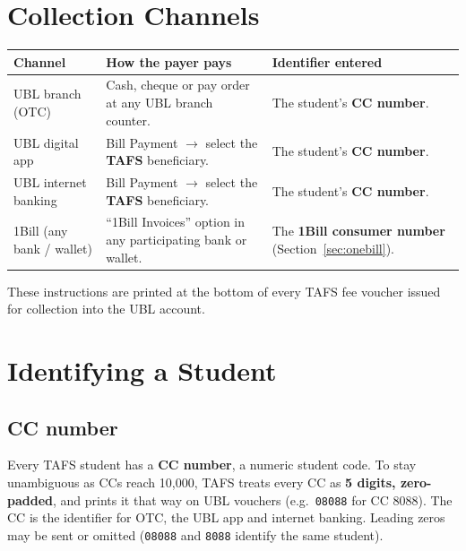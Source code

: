 \documentclass[11pt]{article}
\begin{document}
\section{Collection Channels}

\begin{center}
\begin{tabularx}{\textwidth}{@{}>{\raggedright\arraybackslash}p{} L L@{}}
\toprule
\textbf{Channel} & \textbf{How the payer pays} & \textbf{Identifier entered} \\
\midrule
UBL branch (OTC) & Cash, cheque or pay order at any UBL branch counter. & The student's \textbf{CC number}. \\
UBL digital app & Bill Payment $\rightarrow$ select the \textbf{TAFS} beneficiary. & The student's \textbf{CC number}. \\
UBL internet banking & Bill Payment $\rightarrow$ select the \textbf{TAFS} beneficiary. & The student's \textbf{CC number}. \\
1Bill (any bank / wallet) & ``1Bill Invoices'' option in any participating bank or wallet. & The \textbf{1Bill consumer number} (Section~\ref{sec:onebill}). \\
\bottomrule
\end{tabularx}
\end{center}

\noindent These instructions are printed at the bottom of every TAFS fee voucher issued for
collection into the UBL account.

\section{Identifying a Student}

\subsection{CC number}
Every TAFS student has a \textbf{CC number}, a numeric student code. To stay unambiguous as CCs reach
10,000, TAFS treats every CC as \textbf{5 digits, zero-padded}, and prints it that way on UBL vouchers
(e.g.\ \texttt{08088} for CC 8088). The CC is the identifier for OTC, the UBL app and internet banking.
Leading zeros may be sent or omitted (\texttt{08088} and \texttt{8088} identify the same student).
\end{document}
